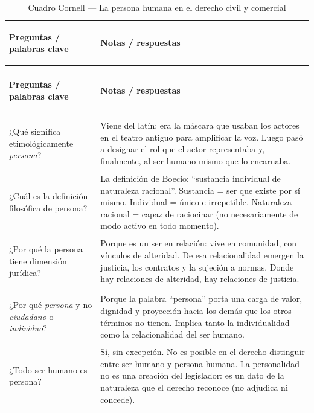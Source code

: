 \documentclass[12pt,oneside]{book}
\begin{document}
\begin{longtable}{
    >{\bfseries\raggedright\arraybackslash}p{}
    >{\raggedright\arraybackslash}p{}
}
\caption{Cuadro Cornell --- La persona humana en el derecho civil y comercial} \\
\toprule
\textbf{Preguntas / palabras clave} & \textbf{Notas / respuestas} \\
\midrule
\endfirsthead

\multicolumn{2}{c}{\tablename\ \thetable{} --- continuación} \\
\toprule
\textbf{Preguntas / palabras clave} & \textbf{Notas / respuestas} \\
\midrule
\endhead

\midrule
\multicolumn{2}{r}{\textit{Continúa en la página siguiente}} \\
\endfoot

\bottomrule
\endlastfoot

¿Qué significa etimológicamente \emph{persona}? &
Viene del latín: era la máscara que usaban los actores en el teatro antiguo para amplificar la voz. Luego pasó a designar el rol que el actor representaba y, finalmente, al ser humano mismo que lo encarnaba. \\

¿Cuál es la definición filosófica de persona? &
La definición de Boecio: ``sustancia individual de naturaleza racional''. Sustancia = ser que existe por sí mismo. Individual = único e irrepetible. Naturaleza racional = capaz de raciocinar (no necesariamente de modo activo en todo momento). \\

¿Por qué la persona tiene dimensión jurídica? &
Porque es un ser en relación: vive en comunidad, con vínculos de alteridad. De esa relacionalidad emergen la justicia, los contratos y la sujeción a normas. Donde hay relaciones de alteridad, hay relaciones de justicia. \\

¿Por qué \emph{persona} y no \emph{ciudadano} o \emph{individuo}? &
Porque la palabra ``persona'' porta una carga de valor, dignidad y proyección hacia los demás que los otros términos no tienen. Implica tanto la individualidad como la relacionalidad del ser humano. \\

¿Todo ser humano es persona? &
Sí, sin excepción. No es posible en el derecho distinguir entre ser humano y persona humana. La personalidad no es una creación del legislador: es un dato de la naturaleza que el derecho reconoce (no adjudica ni concede). \\


\end{longtable}
\end{document}
